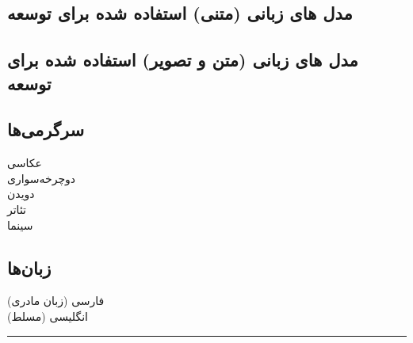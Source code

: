 \documentclass[a4paper]{deedy-persian} %
\begin{document}
\begin{minipage}[t]{0.33\textwidth}
\subsection*{مدل های زبانی (متنی) استفاده شده برای توسعه}

\sectionspace %
\subsection*{مدل های زبانی (متن و تصویر) استفاده شده برای توسعه}
\sectionspace %

\subsection*{سرگرمی‌ها}
عکاسی\\
دوچرخه‌سواری\\
دویدن\\
تئاتر\\
سینما\\

\sectionspace %

\subsection*{زبان‌ها}
فارسی (زبان مادری)\\
انگلیسی (مسلط)\\

\sectionspace %

\end{minipage} %
\hrule
\end{document}
